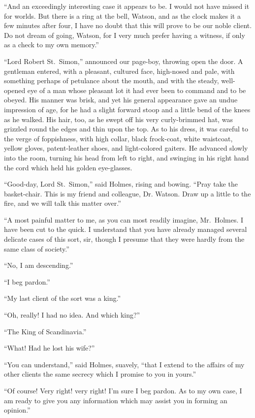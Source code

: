 “And an exceedingly interesting case it appears to be. I
would not have missed it for worlds. But there is a ring at
the bell, Watson, and as the clock makes it a few minutes
after four, I have no doubt that this will prove to be our noble
client. Do not dream of going, Watson, for I very much prefer
having a witness, if only as a check to my own memory.”

“Lord Robert St.~Simon,” announced our page-boy, throwing
open the door. A gentleman entered, with a pleasant,
cultured face, high-nosed and pale, with something perhaps
of petulance about the mouth, and with the steady, well-opened
eye of a man whose pleasant lot it had ever been to command
and to be obeyed. His manner was brisk, and yet his
general appearance gave an undue impression of age, for he
had a slight forward stoop and a little bend of the knees as
he walked. His hair, too, as he swept off his very curly-brimmed
hat, was grizzled round the edges and thin upon the top.
As to his dress, it was careful to the verge of foppishness,
with high collar, black frock-coat, white waistcoat, yellow
gloves, patent-leather shoes, and light-colored gaiters. He
advanced slowly into the room, turning his head from left to
right, and swinging in his right hand the cord which held his
golden eye-glasses.

“Good-day, Lord St.~Simon,” said Holmes, rising and bowing.
“Pray take the basket-chair. This is my friend and
colleague, Dr. Watson. Draw up a little to the fire, and we
will talk this matter over.”

“A most painful matter to me, as you can most readily
imagine, Mr.~Holmes. I have been cut to the quick. I understand
that you have already managed several delicate cases
of this sort, sir, though I presume that they were hardly from
the same class of society.”

“No, I am descending.”

“I beg pardon.”

“My last client of the sort was a king.”

“Oh, really! I had no idea. And which king?”

“The King of Scandinavia.”

“What! Had he lost his wife?”

“You can understand,” said Holmes, suavely, “that I extend
to the affairs of my other clients the same secrecy which
I promise to you in yours.”

“Of course! Very right! very right! I’m sure I beg pardon.
As to my own case, I am ready to give you any information
which may assist you in forming an opinion.”

